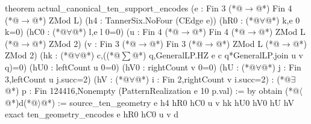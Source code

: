 theorem actual_canonical_ten_support_encodes
    (e : Fin 3 (*@$\to$@*) Fin 4 (*@$\to$@*) ZMod L)
    (h4 : TannerSix.NoFour (CEdge e))
    (hR0 : (*@$\forall$@*) k,e 0 k=0) (hC0 : (*@$\forall$@*) l,e l 0=0)
    (u : Fin 4 (*@$\to$@*) Fin 4 (*@$\to$@*) ZMod L (*@$\to$@*) ZMod 2)
    (v : Fin 3 (*@$\to$@*) Fin 3 (*@$\to$@*) ZMod L (*@$\to$@*) ZMod 2)
    (hk : (*@$\forall$@*) c,((*@$\sum$@*) q,GeneralLP.HZ e c q*GeneralLP.join u v q)=0)
    (hU0 : leftCount u 0=0) (hV0 : rightCount v 0=0)
    (hU : (*@$\forall$@*) j : Fin 3,leftCount u j.succ=2)
    (hV : (*@$\forall$@*) i : Fin 2,rightCount v i.succ=2) :
    (*@$\exists$@*) p : Fin 124416,Nonempty (PatternRealization e 10 p.val) := by
  obtain (*@$\langle$@*)d(*@$\rangle$@*) := source_ten_geometry e h4 hR0 hC0 u v hk hU0 hV0 hU hV
  exact ten_geometry_encodes e hR0 hC0 u v d

